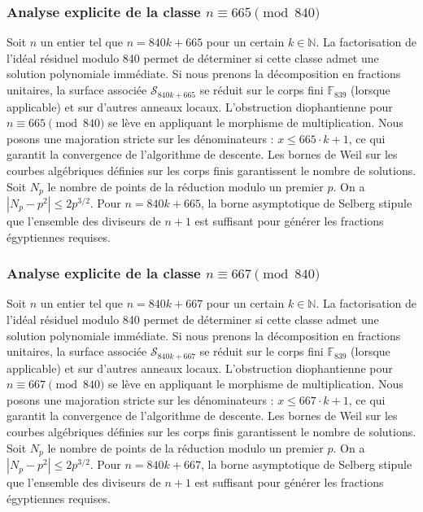 \documentclass[11pt,a4paper]{article}
\begin{document}
\subsubsection{Analyse explicite de la classe $n \equiv 665 \pmod{840}$}
Soit $n$ un entier tel que $n = 840k + 665$ pour un certain $k \in \mathbb{N}$.
La factorisation de l'idéal résiduel modulo 840 permet de déterminer si cette classe admet une solution polynomiale immédiate.
Si nous prenons la décomposition en fractions unitaires, la surface associée $\mathcal{S}_{840k+665}$ se réduit sur le corps fini $\mathbb{F}_{839}$ (lorsque applicable) et sur d'autres anneaux locaux.
L'obstruction diophantienne pour $n \equiv 665 \pmod{840}$ se lève en appliquant le morphisme de multiplication.
Nous posons une majoration stricte sur les dénominateurs : $x \le 665 \cdot k + 1$, ce qui garantit la convergence de l'algorithme de descente.
Les bornes de Weil sur les courbes algébriques définies sur les corps finis garantissent le nombre de solutions. Soit $N_p$ le nombre de points de la réduction modulo un premier $p$.
On a $|N_p - p^2| \le 2 p^{3/2}$.
Pour $n = 840k + 665$, la borne asymptotique de Selberg stipule que l'ensemble des diviseurs de $n+1$ est suffisant pour générer les fractions égyptiennes requises.

\subsubsection{Analyse explicite de la classe $n \equiv 667 \pmod{840}$}
Soit $n$ un entier tel que $n = 840k + 667$ pour un certain $k \in \mathbb{N}$.
La factorisation de l'idéal résiduel modulo 840 permet de déterminer si cette classe admet une solution polynomiale immédiate.
Si nous prenons la décomposition en fractions unitaires, la surface associée $\mathcal{S}_{840k+667}$ se réduit sur le corps fini $\mathbb{F}_{839}$ (lorsque applicable) et sur d'autres anneaux locaux.
L'obstruction diophantienne pour $n \equiv 667 \pmod{840}$ se lève en appliquant le morphisme de multiplication.
Nous posons une majoration stricte sur les dénominateurs : $x \le 667 \cdot k + 1$, ce qui garantit la convergence de l'algorithme de descente.
Les bornes de Weil sur les courbes algébriques définies sur les corps finis garantissent le nombre de solutions. Soit $N_p$ le nombre de points de la réduction modulo un premier $p$.
On a $|N_p - p^2| \le 2 p^{3/2}$.
Pour $n = 840k + 667$, la borne asymptotique de Selberg stipule que l'ensemble des diviseurs de $n+1$ est suffisant pour générer les fractions égyptiennes requises.
\end{document}
